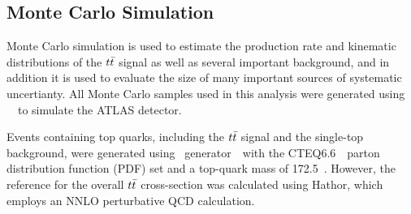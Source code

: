 

\subsection{Monte Carlo Simulation}
\label{s:mc}


Monte Carlo simulation is used to estimate the production rate and kinematic distributions of the $t\bar{t}$ signal as well as several important background, 
and in addition it is used to evaluate the size of many important sources of systematic uncertianty.
All Monte Carlo samples used in this analysis were generated using \GEANT~\cite{geant4}\
to simulate the ATLAS detector.



Events containing top quarks, including the $t\bar{t}$ signal and the single-top background,
were generated using \MCatNLO\ generator~\cite{Frixione:2007vw,Frixione:2003ei,Frixione:2005vw}\
with the CTEQ6.6~\cite{Nadolsky:2008zw}\ parton distribution function (PDF)
set and a top-quark mass of 172.5~\GeV.
However, the reference for the overall $t\bar{t}$ cross-section was calculated using
{\sc Hathor}\cite{Aliev:2010gj}, which employs an NNLO perturbative QCD calculation.



